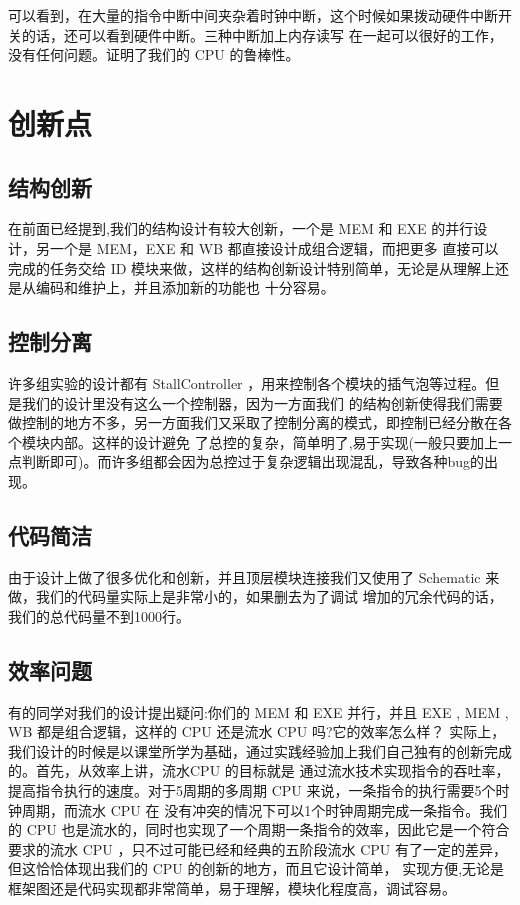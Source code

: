 \documentclass[10pt]{article}
\begin{document}
\begin{CJK}{UTF8}{gbsn}
可以看到，在大量的指令中断中间夹杂着时钟中断，这个时候如果拨动硬件中断开关的话，还可以看到硬件中断。三种中断加上内存读写
在一起可以很好的工作，没有任何问题。证明了我们的 CPU 的鲁棒性。


\section{创新点}
\subsection{结构创新}
在前面已经提到,我们的结构设计有较大创新，一个是 MEM 和 EXE 的并行设计，另一个是 MEM，EXE 和 WB 都直接设计成组合逻辑，而把更多
直接可以完成的任务交给 ID 模块来做，这样的结构创新设计特别简单，无论是从理解上还是从编码和维护上，并且添加新的功能也
十分容易。

\subsection{控制分离}
许多组实验的设计都有 StallController ，用来控制各个模块的插气泡等过程。但是我们的设计里没有这么一个控制器，因为一方面我们
的结构创新使得我们需要做控制的地方不多，另一方面我们又采取了控制分离的模式，即控制已经分散在各个模块内部。这样的设计避免
了总控的复杂，简单明了,易于实现(一般只要加上一点判断即可)。而许多组都会因为总控过于复杂逻辑出现混乱，导致各种bug的出现。

\subsection{代码简洁}
由于设计上做了很多优化和创新，并且顶层模块连接我们又使用了 Schematic 来做，我们的代码量实际上是非常小的，如果删去为了调试
增加的冗余代码的话，我们的总代码量不到1000行。

\subsection{效率问题}
有的同学对我们的设计提出疑问:你们的 MEM 和 EXE 并行，并且 EXE , MEM , WB 都是组合逻辑，这样的 CPU 还是流水 CPU 吗?它的效率怎么样？
实际上，我们设计的时候是以课堂所学为基础，通过实践经验加上我们自己独有的创新完成的。首先，从效率上讲，流水CPU 的目标就是
通过流水技术实现指令的吞吐率，提高指令执行的速度。对于5周期的多周期 CPU 来说，一条指令的执行需要5个时钟周期，而流水 CPU 在
没有冲突的情况下可以1个时钟周期完成一条指令。我们的 CPU 也是流水的，同时也实现了一个周期一条指令的效率，因此它是一个符合
要求的流水 CPU ，只不过可能已经和经典的五阶段流水 CPU 有了一定的差异，但这恰恰体现出我们的 CPU 的创新的地方，而且它设计简单，
实现方便,无论是框架图还是代码实现都非常简单，易于理解，模块化程度高，调试容易。


\end{CJK}
\end{document}
